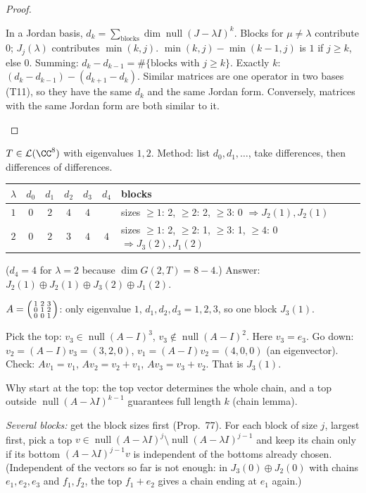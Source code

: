 \documentclass[10pt]{scrartcl}
\DeclareMathOperator{\nul}{null}
\newcommand{\LL}{\mathcal L}
\newenvironment{steps}{\begin{enumerate}[label=\arabic*.,leftmargin=1.5em,itemsep=2pt,topsep=2pt]}{\end{enumerate}}
\begin{document}
\begin{proof}
  \begin{steps}
    \ii In a Jordan basis, $d_k=\sum_{\text{blocks}}\dim\nul(J-\lambda I)^k$. Blocks for $\mu\ne\lambda$ contribute $0$; $J_j(\lambda)$ contributes $\min(k,j)$.
    \ii $\min(k,j)-\min(k-1,j)$ is $1$ if $j\ge k$, else $0$. Summing: $d_k-d_{k-1}=\#\{\text{blocks with }j\ge k\}$. Exactly $k$: $(d_k-d_{k-1})-(d_{k+1}-d_k)$.
    \ii Similar matrices are one operator in two bases (T11), so they have the same $d_k$ and the same Jordan form. Conversely, matrices with the same Jordan form are both similar to it.
  \end{steps}
\end{proof}

\begin{example*}
  $T\in\LL(\CC^8)$ with eigenvalues $1,2$. Method: list $d_0,d_1,\dots$, take differences, then differences of differences.
  \begin{center}
  \begin{tabular}{c|ccccc|l}
    $\lambda$ & $d_0$ & $d_1$ & $d_2$ & $d_3$ & $d_4$ & blocks \\\hline
    $1$ & $0$ & $2$ & $4$ & $4$ & & sizes $\ge1$: 2, $\ge2$: 2, $\ge3$: 0 $\Rightarrow J_2(1),J_2(1)$ \\
    $2$ & $0$ & $2$ & $3$ & $4$ & $4$ & sizes $\ge1$: 2, $\ge2$: 1, $\ge3$: 1, $\ge4$: 0 $\Rightarrow J_3(2),J_1(2)$
  \end{tabular}
  \end{center}
  ($d_4=4$ for $\lambda=2$ because $\dim G(2,T)=8-4$.) Answer: $J_2(1)\oplus J_2(1)\oplus J_3(2)\oplus J_1(2)$.
\end{example*}

\begin{example*}
  $A=\begin{psmallmatrix}1&2&3\\0&1&2\\0&0&1\end{psmallmatrix}$: only eigenvalue $1$, $d_1,d_2,d_3=1,2,3$, so one block $J_3(1)$.
  \begin{steps}
    \ii Pick the top: $v_3\in\nul(A-I)^3$, $v_3\notin\nul(A-I)^2$. Here $v_3=e_3$.
    \ii Go down: $v_2=(A-I)v_3=(3,2,0)$, $v_1=(A-I)v_2=(4,0,0)$ (an eigenvector).
    \ii Check: $Av_1=v_1$, $Av_2=v_2+v_1$, $Av_3=v_3+v_2$. That is $J_3(1)$.
  \end{steps}
  Why start at the top: the top vector determines the whole chain, and a top outside $\nul(A-\lambda I)^{k-1}$ guarantees full length $k$ (chain lemma).

  \emph{Several blocks:} get the block sizes first (Prop.~77). For each block of size $j$, largest first, pick a top $v\in\nul(A-\lambda I)^j\setminus\nul(A-\lambda I)^{j-1}$ and keep its chain only if its bottom $(A-\lambda I)^{j-1}v$ is independent of the bottoms already chosen. (Independent of the vectors so far is not enough: in $J_3(0)\oplus J_2(0)$ with chains $e_1,e_2,e_3$ and $f_1,f_2$, the top $f_1+e_2$ gives a chain ending at $e_1$ again.)
\end{example*}
\end{document}
